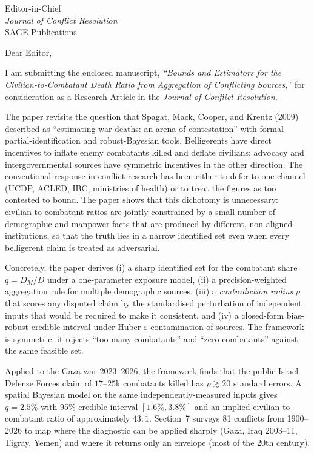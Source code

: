 \documentclass[11pt]{letter}
\begin{document}
\begin{letter}{Editor-in-Chief\\ \emph{Journal of Conflict Resolution}\\ SAGE Publications}

\opening{Dear Editor,}

I am submitting the enclosed manuscript, \emph{``Bounds and Estimators for the Civilian-to-Combatant Death Ratio from Aggregation of Conflicting Sources,''} for consideration as a Research Article in the \emph{Journal of Conflict Resolution}.

The paper revisits the question that Spagat, Mack, Cooper, and Kreutz (2009) described as ``estimating war deaths: an arena of contestation'' with formal partial-identification and robust-Bayesian tools. Belligerents have direct incentives to inflate enemy combatants killed and deflate civilians; advocacy and intergovernmental sources have symmetric incentives in the other direction. The conventional response in conflict research has been either to defer to one channel (UCDP, ACLED, IBC, ministries of health) or to treat the figures as too contested to bound. The paper shows that this dichotomy is unnecessary: civilian-to-combatant ratios are jointly constrained by a small number of demographic and manpower facts that are produced by different, non-aligned institutions, so that the truth lies in a narrow identified set even when every belligerent claim is treated as adversarial.

Concretely, the paper derives (i) a sharp identified set for the combatant share $q=D_M/D$ under a one-parameter exposure model, (ii) a precision-weighted aggregation rule for multiple demographic sources, (iii) a \emph{contradiction radius} $\rho$ that scores any disputed claim by the standardised perturbation of independent inputs that would be required to make it consistent, and (iv) a closed-form bias-robust credible interval under Huber $\varepsilon$-contamination of sources. The framework is symmetric: it rejects ``too many combatants'' and ``zero combatants'' against the same feasible set.

Applied to the Gaza war 2023--2026, the framework finds that the public Israel Defense Forces claim of $17$--$25$k combatants killed has $\rho\gtrsim 20$ standard errors. A spatial Bayesian model on the same independently-measured inputs gives $q=2.5\%$ with 95\% credible interval $[1.6\%,3.8\%]$ and an implied civilian-to-combatant ratio of approximately $43{:}1$. Section~7 surveys 81 conflicts from 1900--2026 to map where the diagnostic can be applied sharply (Gaza, Iraq 2003--11, Tigray, Yemen) and where it returns only an envelope (most of the 20th century).


\end{letter}
\end{document}
